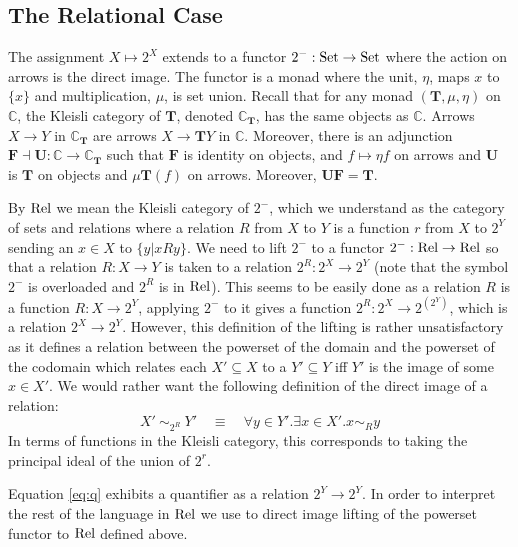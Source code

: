 \subsection{The Relational Case}
The assignment $X \mapsto 2^X$ extends to a functor $2^- : \mathrm{Set} \to
\mathrm{Set}$ where the action on arrows is the direct image. The functor is a
monad where the unit, $\eta$, maps $x$ to $\{x\}$ and multiplication,
$\mu$, is set union. Recall \cite{CWM} that for any monad
$(\mathbf{T}, \mu, \eta)$ on $\mathbb{C}$, the Kleisli category of
$\mathbf{T}$, denoted $\mathbb{C}_{\mathbf{T}}$, has the same objects
as $\mathbb{C}$. Arrows $X \to Y$ in $\mathbb{C}_{\mathbf{T}}$ are
arrows $X \to \mathbf{T}Y$ in $\mathbb{C}$. Moreover, there is an
adjunction $\mathbf{F} \dashv \mathbf{U} : \mathbb{C} \to
\mathbb{C}_\mathbf{T}$ such that $\mathbf{F}$ is identity on objects,
and $f \mapsto \eta f$ on arrows and $\mathbf{U}$ is $\mathbf{T}$ on
objects and $\mu \mathbf{T}(f)$ on arrows. Moreover,
$\mathbf{U}\mathbf{F} = \mathbf{T}$.

By $\mathrm{Rel}$ we mean the Kleisli category of $2^-$, which we
understand as the category of sets and relations where a relation $R$
from $X$ to $Y$ is a function $r$ from $X$ to $2^Y$ sending an $x \in
X$ to $\{ y | x R y \}$.
We need to lift $2^-$ to a functor $2^- : \mathrm{Rel} \to \mathrm{Rel}$
so that a relation $R : X \to Y$ is taken to a relation $2^R : 2^X \to
2^Y$ (note that the symbol $2^-$ is overloaded and $2^R$ is in
$\mathrm{Rel}$). This seems to be easily done as a relation $R$ is a function $R : X
\to 2^Y$, applying $2^-$ to it gives a function $2^R : 2^X \to
2^{(2^Y)}$, which is a relation $2^X \to 2^Y$. However, this
definition of the lifting is rather unsatisfactory as it defines a
relation between the powerset of the domain and the powerset of the
codomain which relates each $X' \subseteq X$ to a $Y' \subseteq Y$ iff
$Y'$ is the image of some $x \in X'$. We would rather want the
following definition of the direct image of a relation:
%
\[
X' ~ \sim_{2^R} ~ Y' \quad \equiv \quad \forall y \in Y'.\exists x \in
X'. x \sim_R y \]
%
In terms of functions in the Kleisli category, this corresponds to
taking the principal ideal of the union of $2^r$. 


\renewcommand{\wp}[1]{2^{#1}} Equation \eqref{eq:q}  exhibits a
quantifier as a relation $\wp{Y} \to \wp{Y}$.  In order to interpret
the rest of the language in $\mathrm{Rel}$ we use to direct image lifting of the powerset
functor to $\mathrm{Rel}$ defined above.





